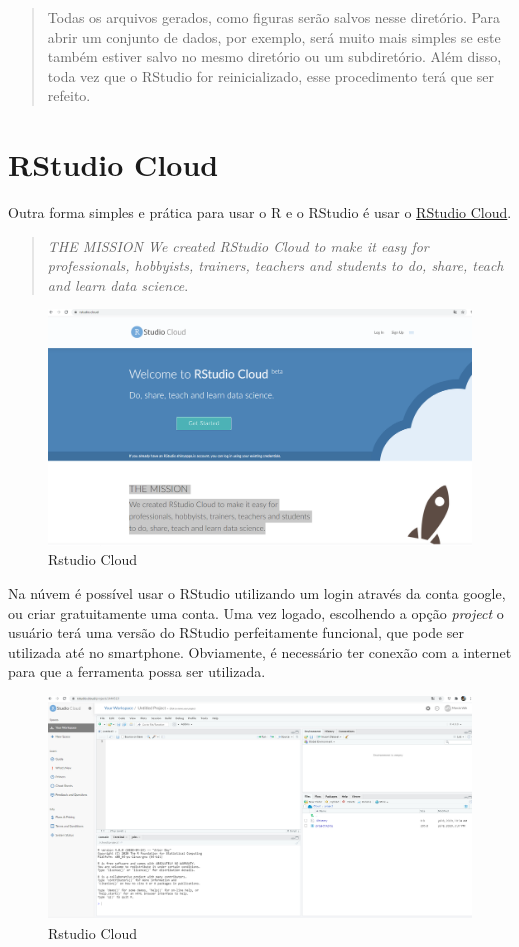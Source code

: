 \documentclass[
]{book}
\theoremstyle{definition}
\theoremstyle{definition}
\theoremstyle{definition}
\theoremstyle{remark}
\begin{document}
\begin{quote}
Todas os arquivos gerados, como figuras serão salvos nesse diretório. Para abrir um conjunto de dados, por exemplo, será muito mais simples se este também estiver salvo no mesmo diretório ou um subdiretório. Além disso, toda vez que o RStudio for reinicializado, esse procedimento terá que ser refeito.
\end{quote}

\hypertarget{rstudio-cloud}{%
\section{RStudio Cloud}\label{rstudio-cloud}}

Outra forma simples e prática para usar o R e o RStudio é usar o \href{https://rstudio.cloud/}{RStudio Cloud}.

\begin{quote}
\emph{THE MISSION
We created RStudio Cloud to make it easy for professionals, hobbyists, trainers, teachers and students to do, share, teach and learn data science}. \citep{rstudiocloud}
\end{quote}

\begin{figure}
\includegraphics[width=0.9\linewidth]{Figuras/RStudioCloud} \caption{Rstudio Cloud}\label{fig:rstudiocloud}
\end{figure}

Na núvem é possível usar o RStudio utilizando um login através da conta google, ou criar gratuitamente uma conta. Uma vez logado, escolhendo a opção \emph{project} o usuário terá uma versão do RStudio perfeitamente funcional, que pode ser utilizada até no smartphone. Obviamente, é necessário ter conexão com a internet para que a ferramenta possa ser utilizada.

\begin{figure}
\includegraphics[width=0.9\linewidth]{Figuras/RStudioCloud2} \caption{Rstudio Cloud}\label{fig:rstudiocloud2}
\end{figure}
\end{document}
